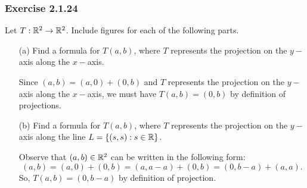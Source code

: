 \subsubsection{Exercise 2.1.24} Let \( T: \mathbb{R}^{2} \to \mathbb{R}^{2} \). Include figures for each of the following parts.
\begin{enumerate}
    \item[(a)] Find a formula for \( T(a,b) \), where \( T  \) represents the projection on the \( y- \)axis along the \( x- \)axis.
        \begin{solution}
        Since \( (a,b) = (a,0) + (0,b)  \) and \( T  \) represents the projection on the \( y- \)axis along the \( x- \)axis, we must have \( T(a,b) = (0,b) \) by definition of projections.
        \end{solution}
    \item[(b)] Find a formula for \( T(a,b)  \), where \( T \) represents the projection on the \( y- \)axis along the line \( L = \{ (s,s) : s \in \mathbb{R}  \}  \).
        \begin{solution}
        Observe that \( (a,b) \in \mathbb{R}^{2} \) can be written in the following form:
        \[  (a,b) = (a,0) + (0,b) = (a, a - a ) + (0,b) = (0,b-a) + (a,a).  \]
        So, \( T(a,b) = (0,b-a) \) by definition of projection.
        \end{solution}
\end{enumerate}

